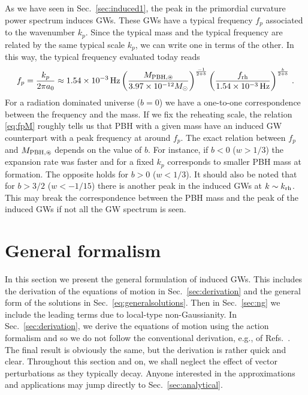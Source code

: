 \documentclass[a4paper,11pt]{article}
\numberwithin{equation}{section}
\begin{document}
As we have seen in Sec.~\ref{sec:induced1}, the peak in the primordial curvature power spectrum induces GWs. These GWs have a typical frequency $f_p$ associated to the wavenumber $k_p$. Since the typical mass and the typical frequency are related by the same typical scale $k_p$, we can write one in terms of the other. In this way, the typical frequency evaluated today reads
\begin{equation}\label{eq:fpM}
f_p=\frac{k_{p}}{2\pi a_0}\approx 1.54\times 10^{-3}\,{\rm Hz}\left(\frac{M_{{\rm PBH},\circledast}}{3.97\times 10^{-12}M_\odot}\right)^{\frac{-1}{2+b}}\left(\frac{f_{\rm rh}}{1.54\times 10^{-3}\,{\rm Hz}}\right)^{\frac{b}{2+b}}\,.
\end{equation}
For a radiation dominated universe ($b=0$) we have a one-to-one correspondence between the frequency and the mass. If we fix the reheating scale, the relation \eqref{eq:fpM} roughly tells us that PBH with a given mass have an induced GW counterpart with a peak frequency at around $f_p$. The exact relation between $f_p$ and $M_{{\rm PBH},\circledast}$ depends on the value of $b$. For instance, if $b<0$ ($w>1/3$) the expansion rate was faster and for a fixed $k_p$ corresponds to smaller PBH mass at formation. The opposite holds for $b>0$ ($w<1/3$). It should also be noted that for $b>3/2$ ($w<-1/15$) there is another peak in the induced GWs at $k\sim k_{\rm rh}$. This may break the correspondence between the PBH mass and the peak of the induced GWs if not all the GW spectrum is seen.



\section{General formalism\label{sec:general}}

In this section we present the general formulation of induced GWs. This includes the derivation of the equations of motion in Sec.~\ref{sec:derivation} and the general form of the solutions in Sec.~\ref{eq:generalsolutions}. Then in Sec.~\ref{sec:ng} we include the leading terms due to local-type non-Gaussianity. In Sec.~\ref{sec:derivation}, we derive the equations of motion using the action formalism and so we do not follow the conventional derivation, e.g., of Refs.~\cite{Matarrese:1992rp,Ananda:2006af}. The final result is obviously the same, but the derivation is rather quick and clear. Throughout this section and on, we shall neglect the effect of vector perturbations as they typically decay. Anyone interested in the approximations and applications may jump directly to Sec.~\ref{sec:analytical}.\\
\end{document}
